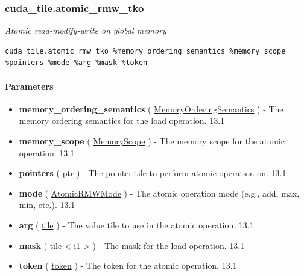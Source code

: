 \documentclass{article}
\begin{document}
\subsubsection{cuda\_tile.atomic\_rmw\_tko}

\textit{Atomic read-modify-write on global memory}


\begin{lstlisting}
cuda_tile.atomic_rmw_tko %memory_ordering_semantics %memory_scope %pointers %mode %arg %mask %token
\end{lstlisting}

\paragraph{Parameters}

\begin{itemize}
\item \textbf{memory\_ordering\_semantics} ( \href{https://docs.nvidia.com/cuda/tile-ir/latest/sections/operations.html#op-attribute-cuda-tile-atomic-rmw-tko-memoryorderingsemantics-attr}{MemoryOrderingSemantics} ) - The memory ordering semantics for the load operation. 13.1
\item \textbf{memory\_scope} ( \href{https://docs.nvidia.com/cuda/tile-ir/latest/sections/operations.html#op-attribute-cuda-tile-atomic-rmw-tko-memoryscope-attr}{MemoryScope} ) - The memory scope for the atomic operation. 13.1
\item \textbf{pointers} ( \href{https://docs.nvidia.com/cuda/tile-ir/latest/sections/types.html#type-ptr}{ptr} ) - The pointer tile to perform atomic operation on. 13.1
\item \textbf{mode} ( \href{https://docs.nvidia.com/cuda/tile-ir/latest/sections/operations.html#op-attribute-cuda-tile-atomic-rmw-tko-atomicrmwmode-attr}{AtomicRMWMode} ) - The atomic operation mode (e.g., add, max, min, etc.). 13.1
\item \textbf{arg} ( \href{https://docs.nvidia.com/cuda/tile-ir/latest/sections/types.html#type-tile}{tile} ) - The value tile to use in the atomic operation. 13.1
\item \textbf{mask} ( \href{https://docs.nvidia.com/cuda/tile-ir/latest/sections/types.html#type-tile}{tile} < \href{https://docs.nvidia.com/cuda/tile-ir/latest/sections/types.html#subsection-element-types}{i1} > ) - The mask for the load operation. 13.1
\item \textbf{token} ( \href{https://docs.nvidia.com/cuda/tile-ir/latest/sections/operations.html#type-token}{token} ) - The token for the atomic operation. 13.1



\end{itemize}
\end{document}
